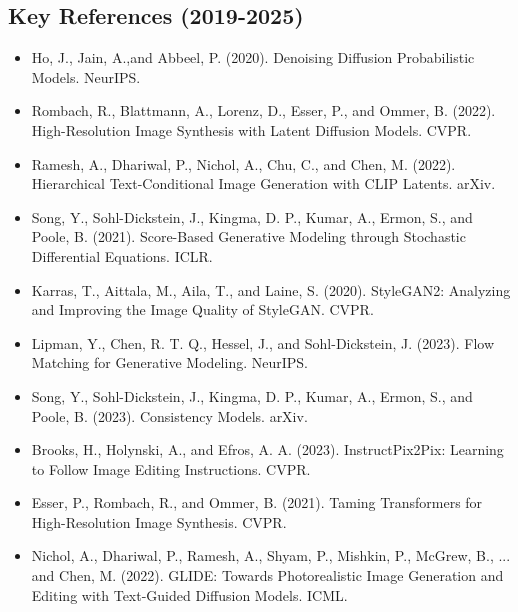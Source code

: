 \subsection*{Key References (2019-2025)}
\begin{itemize}
    \item Ho, J., Jain, A.,and Abbeel, P. (2020). Denoising Diffusion Probabilistic Models. NeurIPS.
    \item Rombach, R., Blattmann, A., Lorenz, D., Esser, P., and Ommer, B. (2022). High-Resolution Image Synthesis with Latent Diffusion Models. CVPR.
    \item Ramesh, A., Dhariwal, P., Nichol, A., Chu, C., and Chen, M. (2022). Hierarchical Text-Conditional Image Generation with CLIP Latents. arXiv.
    \item Song, Y., Sohl-Dickstein, J., Kingma, D. P., Kumar, A., Ermon, S., and Poole, B. (2021). Score-Based Generative Modeling through Stochastic Differential Equations. ICLR.
    \item Karras, T., Aittala, M., Aila, T., and Laine, S. (2020). StyleGAN2: Analyzing and Improving the Image Quality of StyleGAN. CVPR.
    \item Lipman, Y., Chen, R. T. Q., Hessel, J., and Sohl-Dickstein, J. (2023). Flow Matching for Generative Modeling. NeurIPS.
    \item Song, Y., Sohl-Dickstein, J., Kingma, D. P., Kumar, A., Ermon, S., and Poole, B. (2023). Consistency Models. arXiv.
    \item Brooks, H., Holynski, A., and Efros, A. A. (2023). InstructPix2Pix: Learning to Follow Image Editing Instructions. CVPR.
    \item Esser, P., Rombach, R., and Ommer, B. (2021). Taming Transformers for High-Resolution Image Synthesis. CVPR.
    \item Nichol, A., Dhariwal, P., Ramesh, A., Shyam, P., Mishkin, P., McGrew, B., ... and Chen, M. (2022). GLIDE: Towards Photorealistic Image Generation and Editing with Text-Guided Diffusion Models. ICML.
\end{itemize}

